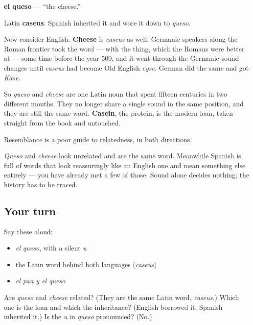 \begin{cousinweb}
\textbf{el queso} — \textquotedblleft{}the cheese.\textquotedblright{}

Latin \textbf{caseus}. Spanish inherited it and wore it down to \emph{queso}.

Now consider English. \textbf{Cheese} is \emph{caseus} as well. Germanic speakers along the Roman frontier took the word — with the thing, which the Romans were better at — some time before the year 500, and it went through the Germanic sound changes until \emph{caseus} had become Old English \emph{cyse}. German did the same and got \emph{Käse}.

So \emph{queso} and \emph{cheese} are one Latin noun that spent fifteen centuries in two different mouths. They no longer share a single sound in the same position, and they are still the same word. \textbf{Casein}, the protein, is the modern loan, taken straight from the book and untouched.
\end{cousinweb}

\begin{grammarlens}[title={What you've built}]
Resemblance is a poor guide to relatedness, in both directions.

\emph{Queso} and \emph{cheese} look unrelated and are the same word. Meanwhile Spanish is full of words that look reassuringly like an English one and mean something else entirely — you have already met a few of those. Sound alone decides nothing; the history has to be traced.
\end{grammarlens}

\subsection*{Your turn}
Say these aloud:

\begin{itemize}
\raggedright
  \item \emph{el queso}, with a silent \emph{u}
  \item the Latin word behind both languages (\emph{caseus})
  \item \emph{el pan y el queso}
\end{itemize}

\begin{tcolorbox}[breakable,colback=teal!4,colframe=teal!35!black,title={Before you move on}]
Are \emph{queso} and \emph{cheese} related? (They are the same Latin word, \emph{caseus}.) Which one is the loan and which the inheritance? (English borrowed it; Spanish inherited it.) Is the \emph{u} in \emph{queso} pronounced? (No.)
\end{tcolorbox}
